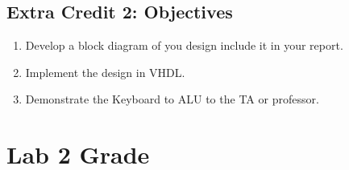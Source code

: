\documentclass{article}
\begin{document}
\subsection{Extra Credit 2: Objectives}
\begin{enumerate}
  \item Develop a block diagram of you design include it in your report.
  \item Implement the design in VHDL.
  \item Demonstrate the Keyboard to ALU to the TA or professor.
\end{enumerate}


\newpage

\section{Lab 2 Grade}
\end{document}
